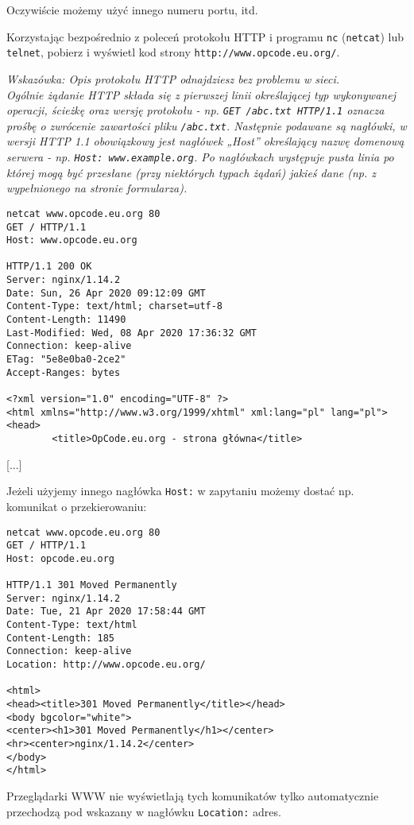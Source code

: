 Oczywiście możemy użyć innego numeru portu, itd.
\fi


\dbEntryCheckResults
Korzystając bezpośrednio z poleceń protokołu HTTP i programu \Verb#nc# (\Verb#netcat#) lub \Verb#telnet#, pobierz i wyświetl kod strony \Verb#http://www.opcode.eu.org/#.

\textit{Wskazówka:
	Opis protokołu HTTP odnajdziesz bez problemu w sieci.\\
	Ogólnie żądanie HTTP składa się z pierwszej linii określającej typ wykonywanej operacji, ścieżkę oraz wersję protokołu - np. \texttt{GET /abc.txt HTTP/1.1} oznacza prośbę o zwrócenie zawartości pliku \texttt{/abc.txt}.
	Następnie podawane są nagłówki, w wersji HTTP 1.1 obowiązkowy jest nagłówek „Host” określający nazwę domenową serwera - np. \texttt{Host: www.example.org}.
	Po nagłówkach występuje pusta linia po której mogą być przesłane (przy niektórych typach żądań) jakieś dane (np. z wypełnionego na stronie formularza).
}
\fi

\dbEntryCheckResults
\begin{Verbatim}
netcat www.opcode.eu.org 80
GET / HTTP/1.1
Host: www.opcode.eu.org

HTTP/1.1 200 OK
Server: nginx/1.14.2
Date: Sun, 26 Apr 2020 09:12:09 GMT
Content-Type: text/html; charset=utf-8
Content-Length: 11490
Last-Modified: Wed, 08 Apr 2020 17:36:32 GMT
Connection: keep-alive
ETag: "5e8e0ba0-2ce2"
Accept-Ranges: bytes

<?xml version="1.0" encoding="UTF-8" ?>
<html xmlns="http://www.w3.org/1999/xhtml" xml:lang="pl" lang="pl">
<head>
        <title>OpCode.eu.org - strona główna</title>
\end{Verbatim}
[...]

\vspace{7pt}
Jeżeli użyjemy innego nagłówka \Verb#Host:# w zapytaniu możemy dostać np. komunikat o przekierowaniu:
\begin{Verbatim}
netcat www.opcode.eu.org 80
GET / HTTP/1.1
Host: opcode.eu.org

HTTP/1.1 301 Moved Permanently
Server: nginx/1.14.2
Date: Tue, 21 Apr 2020 17:58:44 GMT
Content-Type: text/html
Content-Length: 185
Connection: keep-alive
Location: http://www.opcode.eu.org/

<html>
<head><title>301 Moved Permanently</title></head>
<body bgcolor="white">
<center><h1>301 Moved Permanently</h1></center>
<hr><center>nginx/1.14.2</center>
</body>
</html>
\end{Verbatim}
Przeglądarki WWW nie wyświetlają tych komunikatów tylko automatycznie przechodzą pod wskazany w nagłówku \Verb#Location:# adres.
\fi


